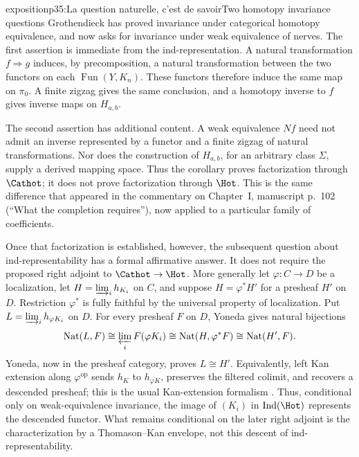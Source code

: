 \begin{dcomment}{exposition}{p35:La question naturelle, c'est de savoir}{Two homotopy invariance questions}
Grothendieck has proved invariance under categorical homotopy equivalence, and now asks for invariance under weak equivalence of nerves. The first assertion is immediate from the ind-representation. A natural transformation $f\Rightarrow g$ induces, by precomposition, a natural transformation between the two functors on each $\operatorname{Fun}(Y,K_n)$. These functors therefore induce the same map on $\pi_0$. A finite zigzag gives the same conclusion, and a homotopy inverse to $f$ gives inverse maps on $H_{a,b}$.

The second assertion has additional content. A weak equivalence $Nf$ need not admit an inverse represented by a functor and a finite zigzag of natural transformations. Nor does the construction of $H_{a,b}$, for an arbitrary class $\Sigma$, supply a derived mapping space. Thus the corollary proves factorization through $\Cathot$; it does not prove factorization through $\Hot$. This is the same difference that appeared in the commentary on Chapter~I, manuscript p.~102 (``What the completion requires''), now applied to a particular family of coefficients.

Once that factorization is established, however, the subsequent question about ind-representability has a formal affirmative answer. It does not require the proposed right adjoint to $\Cathot\to\Hot$. More generally let $\varphi:C\to D$ be a localization, let $H=\varinjlim_i h_{K_i}$ on $C$, and suppose $H=\varphi^*H'$ for a presheaf $H'$ on $D$. Restriction $\varphi^*$ is fully faithful by the universal property of localization. Put $L=\varinjlim_i h_{\varphi K_i}$ on $D$. For every presheaf $F$ on $D$, Yoneda gives natural bijections
\[
 \operatorname{Nat}(L,F)
 \cong\varprojlim_i F(\varphi K_i)
 \cong\operatorname{Nat}(H,\varphi^*F)
 \cong\operatorname{Nat}(H',F).
\]
Yoneda, now in the presheaf category, proves $L\cong H'$. Equivalently, left Kan extension along $\varphi^{\mathrm{op}}$ sends $h_K$ to $h_{\varphi K}$, preserves the filtered colimit, and recovers a descended presheaf; this is the usual Kan-extension formalism \citep[\S\S1.1--1.4]{Riehl2014}. Thus, conditional only on weak-equivalence invariance, the image of $(K_i)$ in $\operatorname{Ind}(\Hot)$ represents the descended functor. What remains conditional on the later right adjoint is the characterization by a Thomason--Kan envelope, not this descent of ind-representability.


\end{dcomment}
